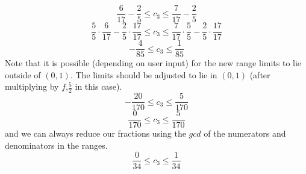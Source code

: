 \documentclass[12pt]{article}
\begin{document}
$$\frac{6}{17}-\frac{2}{5}\leq c_3\leq \frac{7}{17}-\frac{2}{5}$$
$$\frac{5}{5}\cdot\frac{6}{17}-\frac{2}{5}\cdot\frac{17}{17}\leq c_3\leq \frac{7}{17}\cdot\frac{5}{5}-\frac{2}{5}\cdot\frac{17}{17}$$
$$-\frac{4}{85}\leq c_3\leq \frac{1}{85}$$
Note that it is possible (depending on user input) for the new range limits to lie outside of $(0,1)$. The limits should be adjusted to lie in $(0,1)$ (after multiplying by $f$,$\frac{5}{2}$ in this case).
$$-\frac{20}{170}\leq c_3\leq \frac{5}{170}$$
$$\frac{0}{170}\leq c_3\leq \frac{5}{170}$$
and we can always reduce our fractions using the $gcd$ of the numerators and denominators in the ranges.
$$\frac{0}{34}\leq c_3\leq \frac{1}{34}$$
\end{document}
